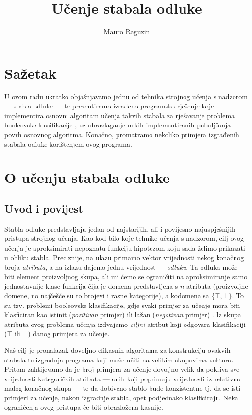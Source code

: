 \documentclass[12pt,a4paper]{article}
\author{Mauro Raguzin}
\title{Učenje stabala odluke}
\begin{document}
\maketitle
\tableofcontents
\section{Sažetak}
U ovom radu ukratko objašnjavamo jednu od tehnika strojnog učenja s nadzorom --- stabla odluke --- te prezentiramo izrađeno programsko rješenje
koje implementira osnovni algoritam učenja takvih stabala za rješavanje problema booleovske klasifikacije
, uz obrazlaganje nekih implementiranih poboljšanja povrh osnovnog algoritma. Konačno, promatramo nekoliko primjera izgrađenih stabala odluke
korištenjem ovog programa.

\section{O učenju stabala odluke}
\subsection{Uvod i povijest}
Stabla odluke predstavljaju jedan od najstarijih, ali i povijesno najuspješnijih pristupa strojnog učenja. Kao kod bilo koje tehnike učenja
s nadzorom, cilj ovog učenja je aproksimirati nepoznatu funkciju hipotezom koju sada želimo prikazati u obliku stabla. Preciznije, na ulazu
primamo vektor vrijednosti nekog konačnog broja \emph{atributa}, a na izlazu dajemo jednu vrijednost --- \emph{odluku}. Ta odluka može
biti element proizvoljnog skupa, ali mi ćemo se ograničiti na aproksimiranje samo jednostavnije klase funkcija čija je domena predstavljena
s $n$ atributa (proizvoljne domene, no najčešće su to brojevi i razne kategorije), a kodomena sa $\{\top,\bot\}$. To su tzv. problemi
booleovske klasifikacije, gdje svaki primjer za učenje mora biti klasficiran kao istinit (\emph{pozitivan} primjer) ili lažan (\emph{negativan}
primjer) \cite{rn}. Iz skupa atributa ovog problema učenja izdvajamo \emph{ciljni} atribut koji odgovara klasifikaciji ($\top$ ili $\bot$)
danog primjera za učenje.

Naš cilj je pronalazak dovoljno efikasnih algoritama za konstrukciju ovakvih stabala te izgradnja programa koji može učiti na 
velikim skupovima vektora. Pritom zahtijevamo da je broj primjera za učenje dovoljno velik da pokriva sve vrijednosti kategoričkih
atributa --- onih koji poprimaju vrijednosti iz relativno malog konačnog skupa --- te da dobiveno stablo bude konzistentno tj. da
se isti primjeri za učenje, nakon izgradnje stabla, opet podjednako klasificiraju. Neka ograničenja ovog pristupa će biti obrazložena kasnije.
\end{document}
